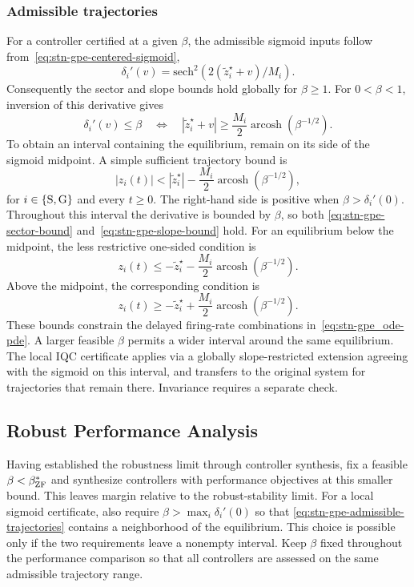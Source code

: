 \subsubsection{Admissible trajectories}
For a controller certified at a given $\beta$, the admissible sigmoid
inputs follow from~\eqref{eq:stn-gpe-centered-sigmoid},
\begin{equation*}
\delta_i'(v)={\text{sech}^2\!\left(2(\tilde z_i^\star+v)/M_i\right)}.
\end{equation*}
Consequently the sector and slope bounds hold globally for $\beta\geq1$.
For $0<\beta<1$, inversion of this derivative gives
\begin{equation*}
\delta_i'(v)\leq\beta
\quad\Longleftrightarrow\quad
|\tilde z_i^\star+v|\geq
\frac{M_i}{2}\operatorname{arcosh}(\beta^{-1/2}).
\end{equation*}
To obtain an interval containing the equilibrium, remain on its side of
the sigmoid midpoint. A simple sufficient trajectory bound is
\begin{equation}\label{eq:stn-gpe-admissible-trajectories}
|z_i(t)|<|\tilde z_i^\star|
          -\frac{M_i}{2}\operatorname{arcosh}(\beta^{-1/2}),
\end{equation}
for $i\in\{{\mathrm{S}},{\mathrm{G}}\}$ and every $t\geq0$.
The right-hand side is positive when $\beta>\delta_i'(0)$. Throughout
this interval the derivative is bounded by $\beta$, so both
\eqref{eq:stn-gpe-sector-bound} and~\eqref{eq:stn-gpe-slope-bound} hold.
For an equilibrium below the midpoint, the less restrictive one-sided
condition is
\begin{equation*}
z_i(t)\leq-\tilde z_i^\star-
\frac{M_i}{2}\operatorname{arcosh}(\beta^{-1/2}).
\end{equation*}
Above the midpoint, the corresponding condition is
\begin{equation*}
z_i(t)\geq-\tilde z_i^\star+
\frac{M_i}{2}\operatorname{arcosh}(\beta^{-1/2}).
\end{equation*}
These bounds constrain the delayed firing-rate combinations
in~\eqref{eq:stn-gpe_ode-pde}. A larger feasible $\beta$ permits a wider
interval around the same equilibrium. The local IQC certificate applies
via a globally slope-restricted extension agreeing with the sigmoid on
this interval, and transfers to the original system for trajectories
that remain there. Invariance requires a separate check.

\subsection{Robust Performance Analysis}
Having established the robustness limit through controller synthesis,
fix a feasible $\beta<\beta_{{\mathrm{ZF}}}^*$ and synthesize controllers
with performance objectives at this smaller bound. This leaves margin
relative to the robust-stability limit. For a local sigmoid
certificate, also require $\beta>\max_i\delta_i'(0)$ so that
\eqref{eq:stn-gpe-admissible-trajectories} contains a neighborhood of the
equilibrium. This choice is possible only if the two requirements leave
a nonempty interval. Keep $\beta$ fixed throughout the performance
comparison so that all controllers are assessed on the same admissible
trajectory range.

